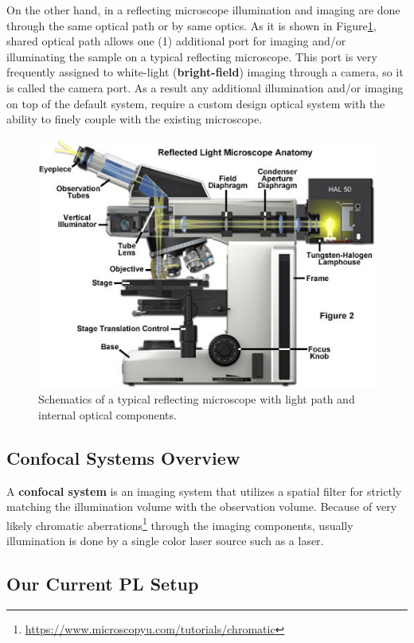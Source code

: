 On the other hand, in a reflecting microscope illumination and imaging are done through the
same optical path or by same optics. As it is shown in Figure\ref{fig:ReflectingMicroscope},
shared optical path allows one (1) additional port for imaging and/or illuminating the sample
on a typical reflecting microscope. This port is very frequently assigned to white-light
(\textbf{bright-field}) imaging through a camera, so it is called the camera port. As a result
any additional illumination and/or imaging on top of the default system, require a custom
design optical system with the ability to finely couple with the existing microscope.

\begin{figure}[H]
	\centering
	\includegraphics[angle=0,origin=c,width = 1.0\linewidth]{Section_Microscope/Figures/ReflectingMicroscope.jpeg}
	\caption{Schematics of a typical reflecting microscope with light path and internal 
		optical components.}
	\label{fig:ReflectingMicroscope}
\end{figure}

\subsection{Confocal Systems Overview}
A \textbf{confocal system} is an imaging system that utilizes a spatial filter
for strictly matching the illumination volume with the observation volume. 
Because of very likely chromatic aberrations\footnote{\url{https://www.microscopyu.com/tutorials/chromatic}}
through the imaging components, usually illumination is done by a single color laser 
source such as a laser.



\subsection{Our Current PL Setup}
